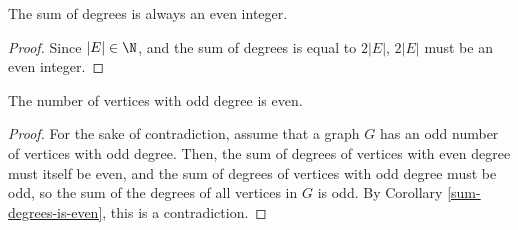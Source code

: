 \documentclass[12pt]{article}
\begin{document}
\begin{cor}\label{sum-degrees-is-even}
    The sum of degrees is always an even integer.
\end{cor}

\begin{proof}
    Since $|E| \in \N$, and the sum of degrees is equal to $2|E|$, $2|E|$ must be an even integer.
\end{proof}

\begin{cor}\label{n-of-odd-vertices-is-even}
    The number of vertices with odd degree is even.
\end{cor}

\begin{proof}
    For the sake of contradiction, assume that a graph $G$ has an odd number of vertices with odd degree. Then, the sum of degrees of vertices with even degree must itself be even, and the sum of degrees of vertices with odd degree must be odd, so the sum of the degrees of all vertices in $G$ is odd. By Corollary \ref{sum-degrees-is-even}, this is a contradiction.
\end{proof}
\end{document}
